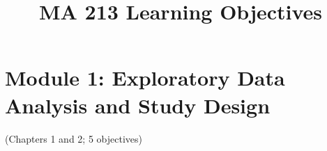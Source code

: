 \documentclass[12pt]{article}
\begin{document}

\title{MA 213 Learning Objectives}
\date{}
\maketitle




    



\section{Module 1: Exploratory Data Analysis and Study Design}
(Chapters 1 and 2; 5 objectives)
\end{document}

